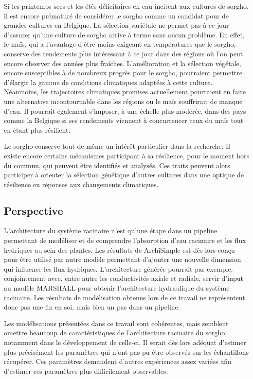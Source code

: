 Si les printemps secs et les étés déficitaires en eau incitent aux cultures de sorgho, il est encore prématuré de considérer le sorgho comme un candidat pour de grandes cultures en Belgique.
La sélection variétale ne permet pas à ce jour d'assurer qu'une culture de sorgho arrive à terme sans aucun problème.
En effet, le maïs, qui a l'avantage d'être moins exigeant en températures que le sorgho, conserve des rendements plus intéressant à ce jour dans des régions où l'on peut encore observer des années plus fraîches.
L'amélioration et la sélection végétale, encore susceptibles à de nombreux progrès pour le sorgho, pourraient permettre d'élargir la gamme de conditions climatiques adaptées à cette culture.
Néanmoins, les trajectoires climatiques promises actuellement pourraient en faire une alternative incontournable dans les régions ou le maïs souffrirait de manque d'eau.
Il pourrait également s'imposer, à une échelle plus modérée, dans des pays comme la Belgique si ses rendements viennent à concurrencer ceux du maïs tout en étant plus résilient.
\newline

Le sorgho conserve tout de même un intérêt particulier dans la recherche.
Il existe encore certains mécanismes participant à sa résilience, pour le moment hors du commun, qui peuvent être identifiés et analysés.
Ces traits peuvent alors participer à orienter la sélection génétique d'autres cultures dans une optique de résilience en réponses aux changements climatiques.

\subsection{Perspective}

L'architecture du système racinaire n'est qu'une étape dans un pipeline permettant de modéliser et de comprendre l'absorption d'eau racinaire et les flux hydriques au sein des plantes.
Les résultats de ArchiSimple est dès lors conçu pour être utilisé par autre modèle permettant d'ajouter une nouvelle dimension qui influence les flux hydriques.
L'architecture générée pourrait par exemple, conjointement avec, entre autre les conductivités axiale et radiale, servir d'input au modèle MARSHALL pour obtenir l'architecture hydraulique du système racinaire.
Les résultats de modélisation obtenus lors de ce travail ne représentent donc pas une fin en soi, mais bien un pas dans un pipeline.
\newline

Les modélisations présentées dans ce travail sont cohérentes, mais semblent omettre beaucoup de caractéristiques de l'architecture racinaire du sorgho, notamment dans le développement de celle-ci.
Il serait dès lors adéquat d'estimer plus précisément les paramètres qui n'ont pas pu être observés sur les échantillons récupérer.
Ces paramètres demandent d'autres expériences assez variées afin d'estimer ces paramètres plus difficilement observables.
\newline


